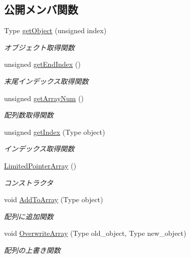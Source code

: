 \subsection*{公開メンバ関数}
\begin{DoxyCompactItemize}
\item 
Type \mbox{\hyperlink{class_limited_pointer_array_ae331bf4564035b62b9e8f08ff989be54}{get\+Object}} (unsigned index)
\begin{DoxyCompactList}\small\item\em オブジェクト取得関数 \end{DoxyCompactList}\item 
unsigned \mbox{\hyperlink{class_limited_pointer_array_a847bfd3ca0f9fd58de3b0a53848fec75}{get\+End\+Index}} ()
\begin{DoxyCompactList}\small\item\em 末尾インデックス取得関数 \end{DoxyCompactList}\item 
unsigned \mbox{\hyperlink{class_limited_pointer_array_ae56197ccd1db87ce3a8d566918e74b25}{get\+Array\+Num}} ()
\begin{DoxyCompactList}\small\item\em 配列数取得関数 \end{DoxyCompactList}\item 
unsigned \mbox{\hyperlink{class_limited_pointer_array_a827d116137d25f41e2e893ad66b20366}{get\+Index}} (Type object)
\begin{DoxyCompactList}\small\item\em インデックス取得関数 \end{DoxyCompactList}\item 
\mbox{\hyperlink{class_limited_pointer_array_acab3e47d77fcd7ed7735a735e1aaf8f9}{Limited\+Pointer\+Array}} ()
\begin{DoxyCompactList}\small\item\em コンストラクタ \end{DoxyCompactList}\item 
void \mbox{\hyperlink{class_limited_pointer_array_a57eb08357204668710021965425f4f46}{Add\+To\+Array}} (Type object)
\begin{DoxyCompactList}\small\item\em 配列に追加関数 \end{DoxyCompactList}\item 
void \mbox{\hyperlink{class_limited_pointer_array_a7cf64a1731ab6d0d63182b6c223fae0b}{Overwrite\+Array}} (Type old\+\_\+object, Type new\+\_\+object)
\begin{DoxyCompactList}\small\item\em 配列の上書き関数 \end{DoxyCompactList}\item 

\end{DoxyCompactItemize}

